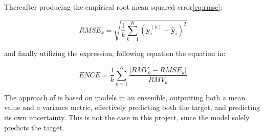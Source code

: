 Thereafter producing the empirical root mean squared error\ref{eq:rmse}:

\begin{equation}\label{eq:rmse}
    RMSE_{k} = \sqrt{\frac{1}{k} \sum_{k=1}^K \left( \mathbf{y}_i^{(k)} - \hat{\mathbf{y}}_i \right)^2}
\end{equation}

and finally utilizing the expression, following equation the equation in\cite{Busk2021}:

\begin{equation}\label{eq:calibration-error}
    ENCE = \frac{1}{k} \sum_{k=1}^K \frac{|RMV_{k} - RMSE_{k}|}{RMV_{k}}
\end{equation}

The approach of \cite{Busk2021} is based on models in an ensemble, outputting both a mean value and a variance metric, effectively
predicting both the target, and predicting its own uncertainty. This is not the case in this project, since the model solely predicts
the target.


\newpage